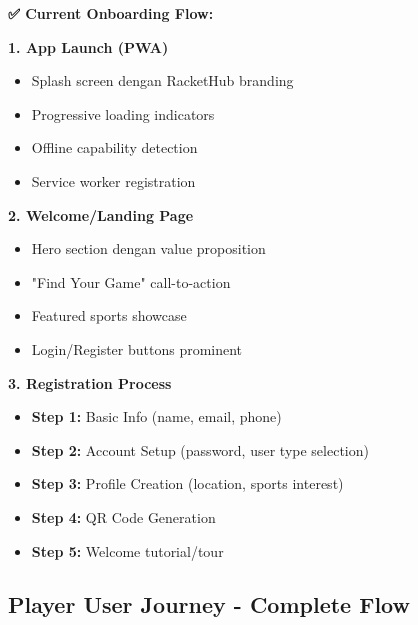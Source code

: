 \documentclass[12pt,a4paper]{article}
\begin{document}
\begin{implemented}
\textbf{✅ Current Onboarding Flow:}

\textbf{1. App Launch (PWA)}
\begin{itemize}
    \item Splash screen dengan RacketHub branding
    \item Progressive loading indicators
    \item Offline capability detection
    \item Service worker registration
\end{itemize}

\textbf{2. Welcome/Landing Page}
\begin{itemize}
    \item Hero section dengan value proposition
    \item "Find Your Game" call-to-action
    \item Featured sports showcase
    \item Login/Register buttons prominent
\end{itemize}

\textbf{3. Registration Process}
\begin{itemize}
    \item \textbf{Step 1:} Basic Info (name, email, phone)
    \item \textbf{Step 2:} Account Setup (password, user type selection)
    \item \textbf{Step 3:} Profile Creation (location, sports interest)
    \item \textbf{Step 4:} QR Code Generation
    \item \textbf{Step 5:} Welcome tutorial/tour
\end{itemize}
\end{implemented}

\subsection{Player User Journey - Complete Flow}
\end{document}
